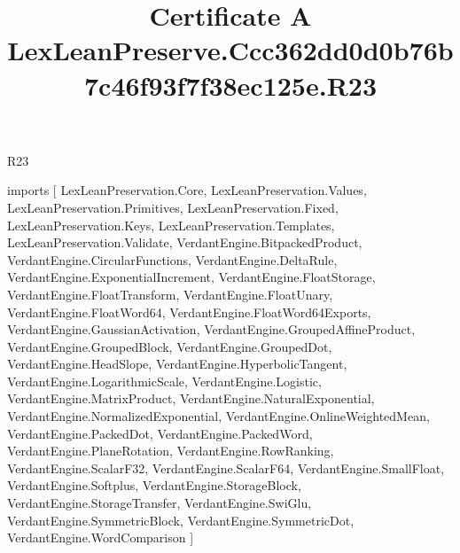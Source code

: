 \begin{lexlean}{R23}
\title{Certificate A LexLeanPreserve.Ccc362dd0d0b76b7c46f93f7f38ec125e.R23}
\begin{coremodule}
imports [
  LexLeanPreservation.Core,
  LexLeanPreservation.Values,
  LexLeanPreservation.Primitives,
  LexLeanPreservation.Fixed,
  LexLeanPreservation.Keys,
  LexLeanPreservation.Templates,
  LexLeanPreservation.Validate,
  VerdantEngine.BitpackedProduct,
  VerdantEngine.CircularFunctions,
  VerdantEngine.DeltaRule,
  VerdantEngine.ExponentialIncrement,
  VerdantEngine.FloatStorage,
  VerdantEngine.FloatTransform,
  VerdantEngine.FloatUnary,
  VerdantEngine.FloatWord64,
  VerdantEngine.FloatWord64Exports,
  VerdantEngine.GaussianActivation,
  VerdantEngine.GroupedAffineProduct,
  VerdantEngine.GroupedBlock,
  VerdantEngine.GroupedDot,
  VerdantEngine.HeadSlope,
  VerdantEngine.HyperbolicTangent,
  VerdantEngine.LogarithmicScale,
  VerdantEngine.Logistic,
  VerdantEngine.MatrixProduct,
  VerdantEngine.NaturalExponential,
  VerdantEngine.NormalizedExponential,
  VerdantEngine.OnlineWeightedMean,
  VerdantEngine.PackedDot,
  VerdantEngine.PackedWord,
  VerdantEngine.PlaneRotation,
  VerdantEngine.RowRanking,
  VerdantEngine.ScalarF32,
  VerdantEngine.ScalarF64,
  VerdantEngine.SmallFloat,
  VerdantEngine.Softplus,
  VerdantEngine.StorageBlock,
  VerdantEngine.StorageTransfer,
  VerdantEngine.SwiGlu,
  VerdantEngine.SymmetricBlock,
  VerdantEngine.SymmetricDot,
  VerdantEngine.WordComparison
]


\end{coremodule}
\end{lexlean}

